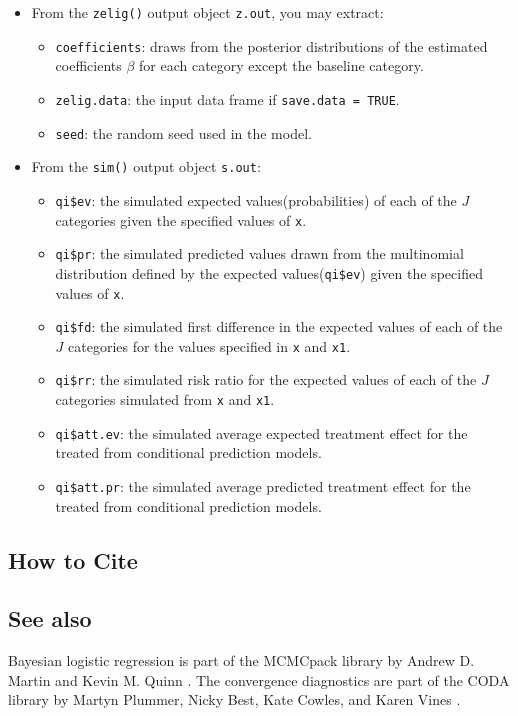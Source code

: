 \begin{itemize}
\item From the \texttt{zelig()} output object \texttt{z.out}, you may extract:

\begin{itemize}
\item \texttt{coefficients}: draws from the posterior distributions
of the estimated coefficients $\beta$ for each category except the baseline
category. 

   \item {\tt zelig.data}: the input data frame if {\tt save.data = TRUE}.  
\item \texttt{seed}: the random seed used in the model.

\end{itemize}

\item From the \texttt{sim()} output object \texttt{s.out}:

\begin{itemize}
\item \texttt{qi\$ev}: the simulated expected values(probabilities) of 
each of the $J$ categories given the specified values of \texttt{x}.

\item \texttt{qi\$pr}: the simulated predicted values drawn from the 
multinomial distribution defined by the expected values(\texttt{qi\$ev})
given the specified values of \texttt{x}.

\item \texttt{qi\$fd}: the simulated first difference in the expected
values of each of the $J$ categories for the values specified in 
\texttt{x} and \texttt{x1}.

\item \texttt{qi\$rr}: the simulated risk ratio for the 
expected values of each of the $J$ categories simulated 
from \texttt{x} and \texttt{x1}.

\item \texttt{qi\$att.ev}: the simulated average expected treatment effect
for the treated from conditional prediction models.

\item \texttt{qi\$att.pr}: the simulated average predicted treatment effect
for the treated from conditional prediction models.
\end{itemize}
\end{itemize}



\subsection* {How to Cite} 



\subsection*{See also}
Bayesian logistic regression is part of the MCMCpack library by Andrew D. Martin and Kevin M. Quinn \citep{MarQui05}. The convergence diagnostics are part of the CODA library by Martyn Plummer, Nicky Best, Kate Cowles, and Karen Vines \citep{PluBesCowVin05}.
